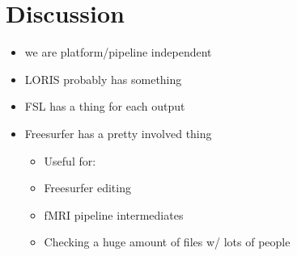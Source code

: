 \section{Discussion}

\begin{itemize}
\item we are platform/pipeline independent
\item LORIS probably has something
\item FSL has a thing for each output
\item Freesurfer has a pretty involved thing
    \begin{itemize}
    \item Useful for:
    \item Freesurfer editing
    \item fMRI pipeline intermediates
    \item Checking a huge amount of files w/ lots of people
    \end{itemize}
\end{itemize}



